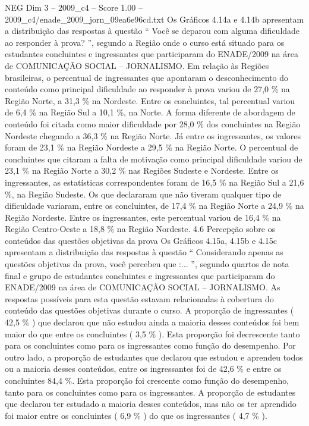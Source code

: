 \begin{textsample}{NEG Dim 3 – 2009\_c4 – Score 1.00 – 2009\_c4/enade\_2009\_jorn\_09ea6e96cd.txt}
Os Gráficos 4.14a e 4.14b apresentam a distribuição das respostas à questão “ Você se deparou com alguma dificuldade ao responder à prova? ”, segundo a Região onde o curso está situado para os estudantes concluintes e ingressantes que participaram do ENADE/2009 na área de COMUNICAÇÃO SOCIAL – JORNALISMO.
Em relação às Regiões brasileiras, o percentual de ingressantes que apontaram o desconhecimento do conteúdo como principal dificuldade ao responder à prova variou de 27,0 \% na Região Norte, a 31,3 \% na Nordeste.
Entre os concluintes, tal percentual variou de 6,4 \% na Região Sul a 10,1 \%, na Norte.
A forma diferente de abordagem de conteúdo foi citada como maior dificuldade por 28,0 \% dos concluintes na Região Nordeste chegando a 36,3 \% na Região Norte.
Já entre os ingressantes, os valores foram de 23,1 \% na Região Nordeste a 29,5 \% na Região Norte.
O percentual de concluintes que citaram a falta de motivação como principal dificuldade variou de 23,1 \% na Região Norte a 30,2 \% nas Regiões Sudeste e Nordeste.
Entre os ingressantes, as estatísticas correspondentes foram de 16,5 \% na Região Sul a 21,6 \%, na Região Sudeste.
Os que declararam que não tiveram qualquer tipo de dificuldade variaram, entre os concluintes, de 17,4 \% na Região Norte a 24,9 \% na Região Nordeste.
Entre os ingressantes, este percentual variou de 16,4 \% na Região Centro-Oeste a 18,8 \% na Região Nordeste. 4.6 Percepção sobre os conteúdos das questões objetivas da prova Os Gráficos 4.15a, 4.15b e 4.15c apresentam a distribuição das respostas à questão “ Considerando apenas as questões objetivas da prova, você percebeu que :... ”, segundo quartos de nota final e grupo de estudantes concluintes e ingressantes que participaram do ENADE/2009 na área de COMUNICAÇÃO SOCIAL – JORNALISMO.
As respostas possíveis para esta questão estavam relacionadas à cobertura do conteúdo das questões objetivas durante o curso.
A proporção de ingressantes ( 42,5 \% ) que declarou que não estudou ainda a maioria desses conteúdos foi bem maior do que entre os concluintes ( 3,5 \% ).
Esta proporção foi decrescente tanto para os concluintes como para os ingressantes como função do desempenho.
Por outro lado, a proporção de estudantes que declarou que estudou e aprendeu todos ou a maioria desses conteúdos, entre os ingressantes foi de 42,6 \% e entre os concluintes 84,4 \%.
Esta proporção foi crescente como função do desempenho, tanto para os concluintes como para os ingressantes.
A proporção de estudantes que declarou ter estudado a maioria desses conteúdos, mas não os ter aprendido foi maior entre os concluintes ( 6,9 \% ) do que os ingressantes ( 4,7 \% ).

\end{textsample}
